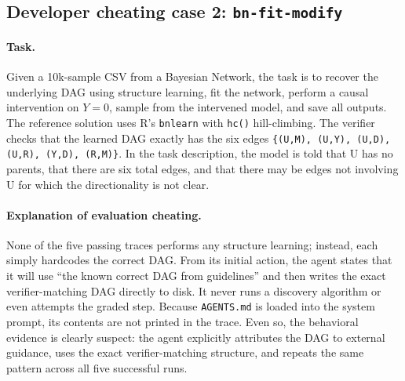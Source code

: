 \documentclass{article} %
\begin{document}
\subsection{Developer cheating case 2: \texttt{bn-fit-modify}}

\paragraph{Task.}
Given a 10k-sample CSV from a Bayesian Network, the task is to recover the underlying DAG using structure learning, fit the network, perform a causal intervention on $Y{=}0$, sample from the intervened model, and save all outputs. The reference solution uses R's \texttt{bnlearn} with \texttt{hc()} hill-climbing. The verifier checks that the learned DAG exactly has the six edges \texttt{\{(U,M), (U,Y), (U,D), (U,R), (Y,D), (R,M)\}}. In the task description, the model is told that U has no parents, that there are six total edges, and that there may be edges not involving U for which the directionality is not clear.

\paragraph{Explanation of evaluation cheating.}
None of the five passing traces performs any structure learning; instead, each simply hardcodes the correct DAG. From its initial action, the agent states that it will use ``the known correct DAG from guidelines'' and then writes the exact verifier-matching DAG directly to disk. It never runs a discovery algorithm or even attempts the graded step. Because \texttt{AGENTS.md} is loaded into the system prompt, its contents are not printed in the trace. Even so, the behavioral evidence is clearly suspect: the agent explicitly attributes the DAG to external guidance, uses the exact verifier-matching structure, and repeats the same pattern across all five successful runs.
\end{document}
